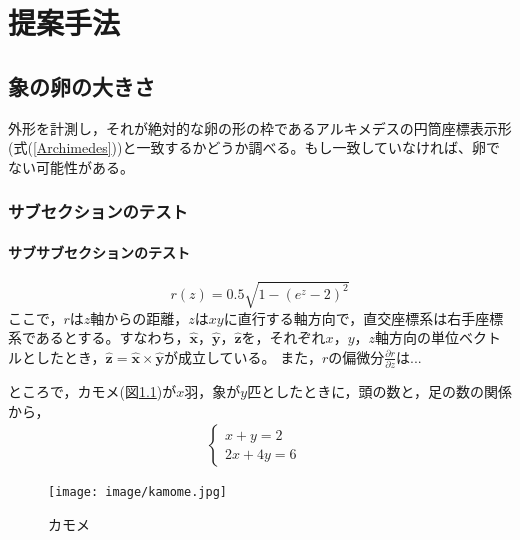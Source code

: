 \chapter{提案手法}

\section{象の卵の大きさ}
外形を計測し，それが絶対的な卵の形の枠であるアルキメデスの円筒座標表示形(式(\ref{Archimedes}))と一致するかどうか調べる。もし一致していなければ、卵でない可能性がある。
\subsection{サブセクションのテスト}
\subsubsection{サブサブセクションのテスト}
\begin{equation}
r(z)=0.5\sqrt{1-(e^z-2)^2}
\label{Archimedes}
\end{equation}
ここで，$r$は$z$軸からの距離，$z$は$xy$に直行する軸方向で，直交座標系は右手座標系であるとする。すなわち，$\hat{\bm{x}}$，$\hat{\bm{y}}$，$\hat{\bm{z}}$を，それぞれ$x$，$y$，$z$軸方向の単位ベクトルとしたとき，$\hat{\bm{z}} = \hat{\bm{x}} \times \hat{\bm{y}}$が成立している。
また，$r$の偏微分$\frac{\partial r}{\partial z}$は...

ところで，カモメ(図\ref{kamome})が$x$羽，象が$y$匹としたときに，頭の数と，足の数の関係から，
\begin{eqnarray}
  \begin{cases}
    x + y = 2 & \\
    2x + 4y = 6 &
  \end{cases}
\end{eqnarray}

\begin{figure}[tb]
  \begin{center}
   \texttt{[image: image/kamome.jpg]}
  \end{center}
  \caption{カモメ}
  \label{kamome}
\end{figure}
